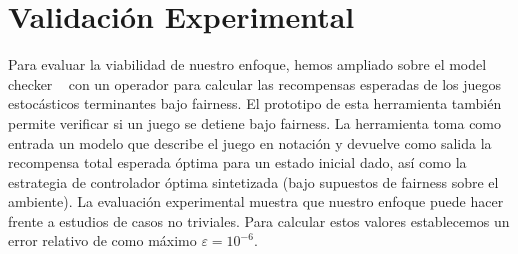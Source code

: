 \section{Validación Experimental} \label{sec:experimental_eval}


Para evaluar la viabilidad de nuestro enfoque, hemos ampliado sobre el model checker {\Prism}~\cite{DBLP:conf/cav/KwiatkowskaN0S20,DBLP:conf/cav/KwiatkowskaNP11} con un operador para calcular las recompensas esperadas de los juegos estocásticos terminantes bajo fairness. El prototipo de esta herramienta también permite verificar si un juego se detiene bajo fairness.
La herramienta toma como entrada un modelo que describe el juego en notación {\Prism} y devuelve como salida
la recompensa total esperada óptima para un estado inicial dado, así como la estrategia de controlador óptima sintetizada (bajo supuestos de fairness sobre el ambiente).
La evaluación experimental muestra que nuestro enfoque puede hacer frente a estudios de casos no triviales. Para calcular estos valores establecemos un error relativo de como máximo $\varepsilon = 10^{-6}$.


